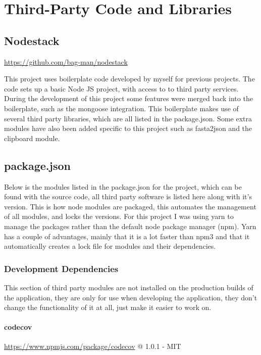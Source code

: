 \chapter{Third-Party Code and Libraries}
\section{Nodestack}

\url{https://github.com/bag-man/nodestack}

This project uses boilerplate code developed by myself for previous projects. The code sets up a basic Node JS project, with access to to third party services. During the development of this project some features were merged back into the boilerplate, such as the mongoose integration.  This boilerplate makes use of several third party libraries, which are all listed in the package.json. Some extra modules have also been added specific to this project such as fasta2json and the clipboard module. 

\section{package.json}
Below is the modules listed in the package.json for the project, which can be found with the source code, all third party software is listed here along with it's version. This is how node modules are packaged, this automates the management of all modules, and locks the versions. For this project I was using yarn\cite{yarn} to manage the packages rather than the default node package manager (npm)\cite{npm}. Yarn has a couple of advantages, mainly that it is a lot faster than npm3 and that it automatically creates a lock file for modules and their dependencies. 

\subsection{Development Dependencies}
  This section of third party modules are not installed on the production builds of the application, they are only for use when developing the application, they don't change the functionality of it at all, just make it easier to work on. 

\subsubsection*{codecov} 

\url{https://www.npmjs.com/package/codecov} @ 1.0.1 - MIT

